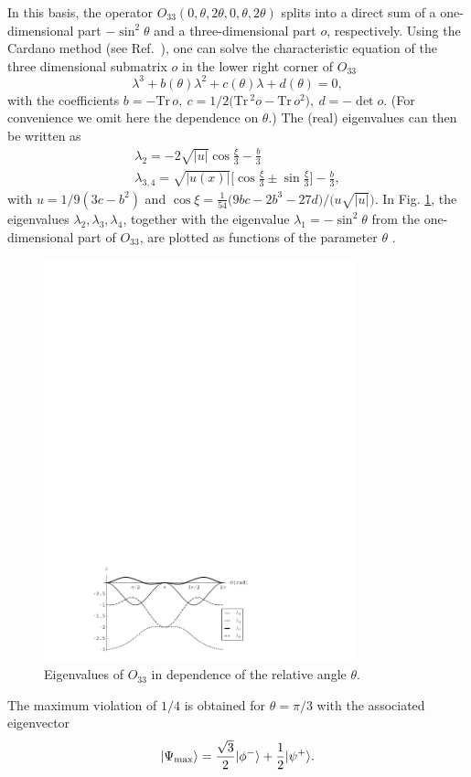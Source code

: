 \documentclass[pra,showpacs,showkeys,amsfonts,amsmath]{revtex4}
\begin{document}
In this basis, the operator $O_{33}(0,\theta,2\theta,0,\theta,2\theta)$
splits into a direct sum of a one-dimensional part $-\sin^2\theta $
and a three-dimensional part $o$, respectively. Using the Cardano method
(see Ref.~\cite{cocolicchio00}), one can
solve the characteristic equation of the three dimensional submatrix
$o$ in the lower right corner of $O_{33}$
\begin{equation}
  \lambda^3 + b(\theta) \lambda^2 + c(\theta) \lambda + d(\theta) = 0,
\label{2004-qbounds-characteristic}
\end{equation}
with the coefficients $b = -\text{Tr}\, o,\ c = 1/2\Big(\text{Tr}\,^2 o -
\text{Tr}\, o^2 \Big),\ d = -\det o$. (For convenience we omit here the
dependence on $\theta$.) The (real) eigenvalues can then be written as \cite{cocolicchio00}
\begin{eqnarray}
\lambda_2 = -2 \sqrt{|u|}\cos\frac{\xi}{3}-\frac{b}{3}\nonumber\\
\lambda_{3,4} = \sqrt{|u(x)|}\Big[\cos\frac{\xi}{3} \pm
\sin\frac{\xi}{3}\Big]-\frac{b}{3},
\label{2004-qbounds-o33ev}
\end{eqnarray}
with $u=1/9(3 c-b^2)$ and $\cos\xi = \frac{1}{54}\big(9 b c -2 b^3 - 27 d\big)/\big(u\sqrt{|u|}\big)$.
In Fig. \ref{fig:2004-qbounds-f1},
the eigenvalues $\lambda_2, \lambda_3, \lambda_4$,
together with the eigenvalue $\lambda_1 = -\sin^2\theta$ from the
one-dimensional part of $O_{33}$, are plotted  as functions of the parameter $\theta$ .
\begin{figure}[htbp]
  \centering
  \includegraphics[width=90mm]{2004-qbounds-f1}
  \caption{Eigenvalues of $O_{33}$ in dependence of the relative angle $\theta$.}
  \label{fig:2004-qbounds-f1}
\end{figure}
The maximum violation of $1/4$ is obtained for $\theta=\pi/3$ with the associated
eigenvector
\begin{equation}
  |\Psi_{\rm max } \rangle=\frac{\sqrt{3}}{2}|\phi^- \rangle+\frac{1}{2}|\psi^+ \rangle.
\label{2004-qbounds-pmax33}
\end{equation}
\end{document}
